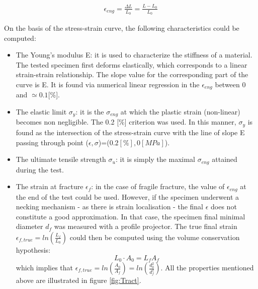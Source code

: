 \begin{align*}
\epsilon_{eng}=\frac{\Delta L}{L_0}=\frac{L-L_0}{L_0}
\end{align*}

On the basis of the stress-strain curve, the following characteristics could be computed:

\begin{itemize}

\item The Young's modulus E: it is used to characterize the stiffness of a material. The tested specimen first deforms elastically, which corresponds to a linear strain-strain relationship. The slope value for the corresponding part of the curve is  E. It is found via numerical linear regression in the $\epsilon_{eng}$ between 0 and $\simeq 0.1$[\%].

\item The elastic limit $\sigma_y$: it is the $\sigma_{eng}$ at which the plastic strain (non-linear) becomes non negligible. The 0.2 [\%] criterion was used. In this manner, $\sigma_y$ is found as the intersection of the stress-strain curve with the line of slope E passing through point ($\epsilon,\sigma$)=($0.2 [\%],0 [MPa]$).

\item The ultimate tensile strength $\sigma_u$: it is simply the maximal $\sigma_{eng}$ attained during the test.

\item The strain at fracture $\epsilon_{f}$: in the case of fragile fracture, the value of $\epsilon_{eng}$ at the end of the test could be used. However, if the specimen underwent a necking mechanism -  as there is strain localisation - the final $\epsilon$ does not constitute a good approximation. In that case, the specimen final minimal diameter $d_f$ was measured with a profile projector. The true final strain $\epsilon_{f,true}=ln(\frac{L_f}{L_0})$ could then be computed using the volume conservation hypothesis: $$L_0 \cdot A_0 = L_f A_f $$
which implies that $\epsilon_{f,true}=ln(\frac{A_0}{A_f})=ln(\frac{d_0^2}{d_f^2})$. All the properties mentioned above are illustrated in figure \ref{fig:Tract}.


\end{itemize}

